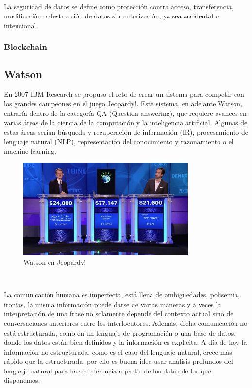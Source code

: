 \documentclass[paper=a4, fontsize=10pt]{scrartcl} %
\numberwithin{equation}{section} %
\numberwithin{figure}{section} %
\numberwithin{table}{section} %
\begin{document}
\

La seguridad de datos se define como protección contra acceso, transferencia, modificación o destrucción de datos sin autorización, ya sea accidental o intencional.












\subsubsection{Blockchain}
\subsection{Watson}
En 2007 \href{https://www.research.ibm.com/}{IBM Research} se propuso el reto de crear un sistema para competir con los grandes campeones en el juego \href{https://www.jeopardy.com/}{Jeopardy!}. 
Este sistema, en adelante Watson, entraría dentro de la categoría QA (Question answering), que requiere avances en varias áreas de la ciencia de la computación y la inteligencia artificial. 
Algunas de estas áreas serían búsqueda y recuperación de información (IR), procesamiento de lenguaje natural (NLP), representación del conocimiento y razonamiento o el machine learning.

\begin{figure}[H]
	\centering
	\label{j-watson}
	\includegraphics[width=0.8\textwidth]{./Imagenes/j-watson.jpg}
	\caption{Watson en Jeopardy!}
\end{figure}

\

La comunicación humana es imperfecta, está llena de ambigüedades, polisemia, ironías, la misma información puede darse de varias maneras y a veces la interpretación de una frase no solamente depende del contexto actual sino de conversaciones anteriores entre los interlocutores.
Además, dicha comunicación no está estructurada, como en un lenguaje de programación o una base de datos, donde los datos están bien definidos y la información es explícita.
A día de hoy la información no estructurada, como es el caso del lenguaje natural, crece más rápido que la estructurada, por ello es buena idea usar análisis profundos del lenguaje natural para hacer inferencia a partir de los datos de los que disponemos.
\end{document}
